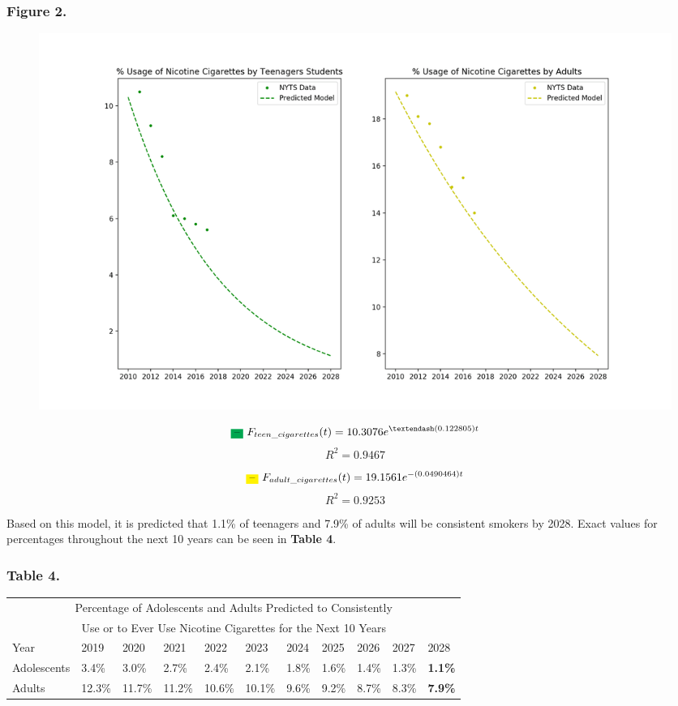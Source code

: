 \subsubsection*{Figure 2.}
\begin{figure}[H]
    \centering \includegraphics*[scale=.25]{assets/math-modeling-figure-2.png}
\end{figure}

\begin{equation}
    \text{\colorbox{Green}{--} } F_{teen\_cigarettes}(t) = 10.3076e^{–(0.122805)t}
\end{equation}
\[R^2 = 0.9467\]

\begin{equation}
    \text{\colorbox{Yellow}{--} } F_{adult\_cigarettes}(t) = 19.1561e^{-(0.0490464)t}
\end{equation}
\[R^2 = 0.9253\]

Based on this model, it is predicted that 1.1\% of teenagers and 7.9\% of adults will be consistent smokers by 2028. Exact values for percentages throughout the next 10 years can be seen in \textbf{Table 4}.

\subsubsection*{Table 4.}
\begin{center}
    \begin{tabular}{p{1in} p{0.4in} p{0.4in} p{0.4in} p{0.4in} p{0.4in} p{0.4in} p{0.4in} p{0.4in} p{0.4in} p{0.4in}}
        \toprule
        \multicolumn{11}{c}{Percentage of Adolescents and Adults Predicted to Consistently}\\
        \multicolumn{11}{c}{Use or to Ever Use Nicotine Cigarettes for the Next 10 Years}\\    
        \midrule
        Year & 2019 & 2020 & 2021 & 2022 & 2023 & 2024 & 2025 & 2026 & 2027 & 2028 \\
        \midrule
        Adolescents & 3.4\% & 3.0\% & 2.7\% & 2.4\% & 2.1\% & 1.8\% & 1.6\% & 1.4\% & 1.3\% & \textbf{1.1\%} \\
        Adults & 12.3\% & 11.7\% & 11.2\% & 10.6\% & 10.1\% & 9.6\% & 9.2\% & 8.7\% & 8.3\% & \textbf{7.9\%} \\
        \bottomrule
    \end{tabular}
\end{center}

